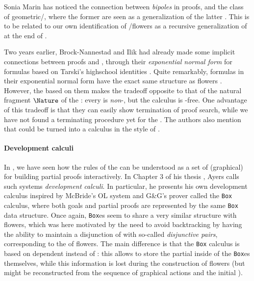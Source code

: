 \begin{scope}
Sonia Marin has noticed the connection between \emph{bipoles} in 
proofs, and the class of geometric/, where the former are seen
as a generalization of the latter . This is to be
related to our own identification of /flowers as a recursive
generalization of  at the end of .

Two years earlier, Brock-Nannestad and Ilik had already made some implicit
connections between  proofs and , through their
\emph{exponential normal form} for  formulas based on Tarski's
highschool identities . Quite
remarkably,  formulas in their exponential normal form have the exact
same structure as flowers
\cite[Definition~4.2]{brock-nannestad_intuitionistic_2019}. However, the   based on them makes the tradeoff opposite to that of the
natural fragment $\Nature$ of the : every  is
\emph{non}-, but the calculus is -free. One advantage of
this tradeoff is that they can easily show termination of proof search, while we
have not found a terminating procedure yet for the . The authors
also mention that  could be turned into a  calculus in the
style of .

\paragraph{Development calculi}

In , we have seen how the rules of the 
can be understood as a set of (graphical)  for building partial proofs
interactively. In Chapter 3 of his thesis , Ayers calls
such systems \emph{development calculi}. In particular, he presents his own
development calculus inspired by McBride's OL system
 and G\&G's prover
 called the \texttt{Box} calculus, where both
goals and partial proofs are represented by the same \texttt{Box} data
structure. Once again, \texttt{Box}es seem to share a very similar structure
with flowers, which was here motivated by the need to avoid backtracking by
having the ability to maintain a disjunction of  with so-called
\emph{disjunctive pairs}, corresponding to the  of flowers. The main
difference is that the \texttt{Box} calculus is based on dependent 
instead of : this allows to store the partial 
inside of the \texttt{Box}es themselves, while this information is lost during
the construction of flowers (but might be reconstructed from the sequence of
graphical actions and the initial ).


\end{scope}
